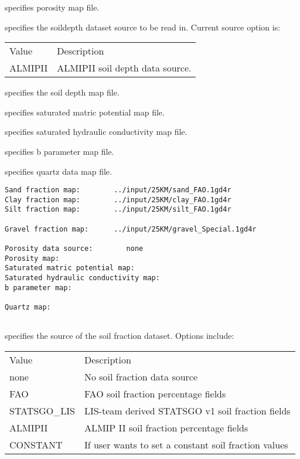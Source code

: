   specifies porosity map file.

  specifies the soildepth dataset source
 to be read in.  Current source option is:

 \begin{tabular}{ll}
 Value      & Description    \\
   ALMIPII  &  ALMIPII soil depth data source. \\
 \end{tabular}

  specifies the soil depth map file.

  specifies saturated matric
 potential map file.

  specifies saturated
 hydraulic conductivity map file.

  specifies b parameter map file.

 
  specifies quartz data map file.
 
 

 \begin{Verbatim}[frame=single]
Sand fraction map:        ../input/25KM/sand_FAO.1gd4r
Clay fraction map:        ../input/25KM/clay_FAO.1gd4r
Silt fraction map:        ../input/25KM/silt_FAO.1gd4r
 
Gravel fraction map:      ../input/25KM/gravel_Special.1gd4r
 
Porosity data source:        none
Porosity map:                  
Saturated matric potential map:       
Saturated hydraulic conductivity map: 
b parameter map:                      
 
Quartz map:                           
 
 \end{Verbatim}

 
  specifies the source
  of the soil fraction dataset.
  Options include:

 \begin{tabular}{ll}
 Value   & Description                         \\
 none    & No soil fraction data source        \\
 FAO     & FAO soil fraction percentage fields \\
 STATSGO\_LIS & LIS-team derived STATSGO v1 soil fraction fields \\
 ALMIPII  & ALMIP II soil fraction percentage fields \\
 CONSTANT & If user wants to set a constant soil fraction values \\
 \end{tabular}
 

